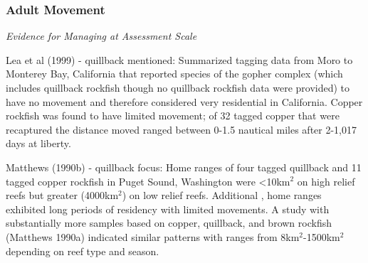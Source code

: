 \documentclass[11pt,
  english,
  letterpaper,
]{article}
\begin{document}
\tagmcend\tagstructend


\hypertarget{adult-movement}{%
\subsubsection{Adult Movement}\label{adult-movement}}

\leavevmode\tagmcend\tagstructend


\emph{Evidence for Managing at Assessment Scale}

\leavevmode\tagmcend\tagstructend\par


Lea et al {(1999)\leavevmode\tagmcend\tagstructend} - quillback mentioned: Summarized tagging data from Moro to Monterey Bay, California that reported species of the gopher complex (which includes quillback rockfish though no quillback rockfish data were provided) to have no movement and therefore considered very residential in California. Copper rockfish was found to have limited movement; of 32 tagged copper that were recaptured the distance moved ranged between 0-1.5 nautical miles after 2-1,017 days at liberty.

\leavevmode\tagmcend\tagstructend\par


Matthews {(1990b)\leavevmode\tagmcend\tagstructend} - quillback focus: Home ranges of four tagged quillback and 11 tagged copper rockfish in Puget Sound, Washington were \textless10km{\(^2\)\leavevmode\tagmcend\tagstructend} on high relief reefs but greater (4000km{\(^2\)\leavevmode\tagmcend\tagstructend}) on low relief reefs. Additional , home ranges exhibited long periods of residency with limited movements. A study with substantially more samples based on copper, quillback, and brown rockfish {(Matthews 1990a)\leavevmode\tagmcend\tagstructend} indicated similar patterns with ranges from 8km{\(^2\)\leavevmode\tagmcend\tagstructend}-1500km{\(^2\)\leavevmode\tagmcend\tagstructend} depending on reef type and season.
\end{document}
